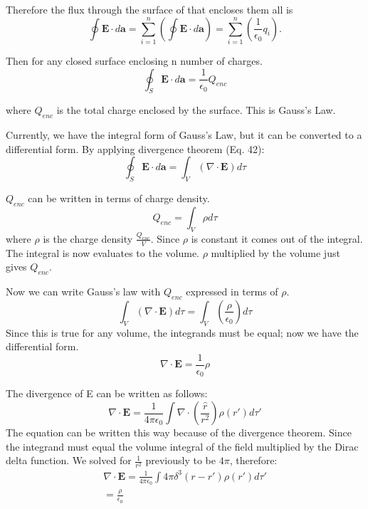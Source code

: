 Therefore the flux through the surface of that encloses them all is
\begin{equation}
\oint\mathbf{E}\cdot d\mathbf{a} = \sum_{i=1}^{n}(\oint\mathbf{E}\cdot d\mathbf{a}) = \sum_{i=1}^{n}(\frac{1}{\epsilon_0}q_i).
\end{equation}

Then for any closed surface enclosing n number of charges.
\begin{equation}
\boxed{\oint_S \mathbf{E}\cdot d\mathbf{a} = \frac{1}{\epsilon_0}Q_{enc}}
\end{equation}

where \( Q_{enc} \) is the total charge enclosed by the surface. This is Gauss's Law.

Currently, we have the integral form of Gauss's Law, but it can be converted to a differential form. By applying divergence theorem (Eq. 42): 
\begin{equation}
\oint_S \mathbf{E}\cdot d\mathbf{a} = \int_V (\nabla{} \cdot \mathbf{E}) d\tau
\end{equation}

\newpage

\( Q_{enc} \) can be written in terms of charge density. 
\begin{equation}
Q_{enc} = \int_V \rho d\tau
\end{equation}
where \( \rho \) is the charge density \( \frac{Q_{enc}}{V} \). Since \( \rho \) is constant it comes out of the integral. The integral is now evaluates to the volume. \( \rho \) multiplied by the volume just gives \( Q_{enc} \).

Now we can write Gauss's law with \( Q_{enc} \) expressed in terms of \( \rho \). 
\begin{equation}
\int_V (\nabla{} \cdot \mathbf{E}) d\tau = \int_V (\frac{\rho}{\epsilon_0})d\tau
\end{equation}
Since this is true for any volume, the integrands must be equal; now we have the differential form.
\begin{equation}
\boxed{\nabla{} \cdot \mathbf{E} = \frac{1}{\epsilon_0}\rho}
\end{equation}

The divergence of E can be written as follows:
\begin{equation}
\nabla{} \cdot \mathbf{E} = \frac{1}{4\pi\epsilon_0}\int \nabla{} \cdot (\frac{\hat{r}}{r^2})\rho(r')d\tau'
\end{equation}
The equation can be written this way because of the divergence theorem. Since the integrand must equal the volume integral of the field multiplied by the Dirac delta function. We solved for \( \frac{1}{r^2} \) previously to be \( 4\pi \), therefore:
\begin{equation}
\begin{gathered}
\nabla{} \cdot \mathbf{E} = \frac{1}{4\pi\epsilon_0}\int 4\pi\delta^3(r-r')\rho(r')d\tau' \\
=\frac{\rho}{\epsilon_0}
\end{gathered}
\end{equation}


